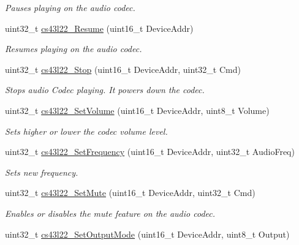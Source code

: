\begin{DoxyCompactItemize}
\begin{DoxyCompactList}\small\item\em Pauses playing on the audio codec. \end{DoxyCompactList}\item 
uint32\+\_\+t \mbox{\hyperlink{group___c_s43_l22___exported___functions_ga579c0ef6455060e9117632f8d83d606a}{cs43l22\+\_\+\+Resume}} (uint16\+\_\+t Device\+Addr)
\begin{DoxyCompactList}\small\item\em Resumes playing on the audio codec. \end{DoxyCompactList}\item 
uint32\+\_\+t \mbox{\hyperlink{group___c_s43_l22___exported___functions_ga8e551ac489dbd2b701f0ac6ed54c143b}{cs43l22\+\_\+\+Stop}} (uint16\+\_\+t Device\+Addr, uint32\+\_\+t Cmd)
\begin{DoxyCompactList}\small\item\em Stops audio Codec playing. It powers down the codec. \end{DoxyCompactList}\item 
uint32\+\_\+t \mbox{\hyperlink{group___c_s43_l22___exported___functions_ga9cd060bb226e44065ec50c7803041114}{cs43l22\+\_\+\+Set\+Volume}} (uint16\+\_\+t Device\+Addr, uint8\+\_\+t Volume)
\begin{DoxyCompactList}\small\item\em Sets higher or lower the codec volume level. \end{DoxyCompactList}\item 
uint32\+\_\+t \mbox{\hyperlink{group___c_s43_l22___exported___functions_ga1ea4920e35f5e5f903870a50b53bc719}{cs43l22\+\_\+\+Set\+Frequency}} (uint16\+\_\+t Device\+Addr, uint32\+\_\+t Audio\+Freq)
\begin{DoxyCompactList}\small\item\em Sets new frequency. \end{DoxyCompactList}\item 
uint32\+\_\+t \mbox{\hyperlink{group___c_s43_l22___exported___functions_gaed17c2b64d79830afa43b5a45b159286}{cs43l22\+\_\+\+Set\+Mute}} (uint16\+\_\+t Device\+Addr, uint32\+\_\+t Cmd)
\begin{DoxyCompactList}\small\item\em Enables or disables the mute feature on the audio codec. \end{DoxyCompactList}\item 
uint32\+\_\+t \mbox{\hyperlink{group___c_s43_l22___exported___functions_gaad55b2ed28b599b34f4bfe50df745f0d}{cs43l22\+\_\+\+Set\+Output\+Mode}} (uint16\+\_\+t Device\+Addr, uint8\+\_\+t Output)

\end{DoxyCompactItemize}
